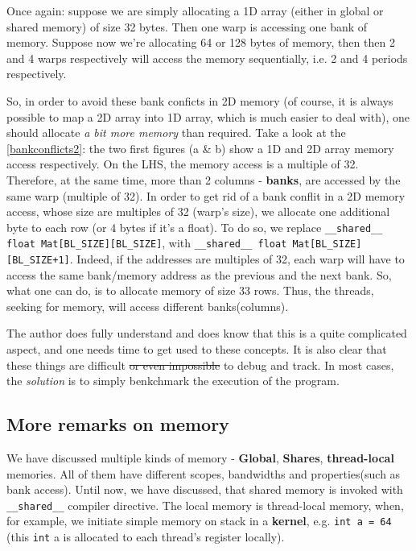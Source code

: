 \documentclass[12pt]{article}
\begin{document}
Once again: suppose we are simply allocating a 1D array (either in global or shared memory) of size 32 bytes. Then one warp is accessing one bank of memory. 
Suppose now we're allocating 64 or 128 bytes of memory, then then 2 and 4 warps  respectively will access the memory sequentially, i.e. 2 and 4 periods respectively.

So, in order to avoid these bank conficts in 2D memory (of course, it is always possible to map a 2D array into 1D array, which is much easier to deal with), one should allocate 
\textit{a bit more memory} than required. Take a look at the \autoref{bankconflicts2}: the two first figures (a \& b) show a 1D and 2D array memory access respectively. 
On the LHS, the memory access is a multiple of 32. Therefore, at the same time, more than 2 columns - \textbf{banks}, are accessed by the same warp (multiple of 32). 
In order to get rid of a bank conflit in a 2D memory access, whose size are multiples of 32 (warp's size), we allocate one additional byte to each row (or 4 bytes if it's a float).
To do so, we replace \verb|__shared__ float Mat[BL_SIZE][BL_SIZE]|, with \verb|__shared__ float Mat[BL_SIZE][BL_SIZE+1]|. Indeed, if the addresses are multiples of 32, each warp will 
have to access the same bank/memory address as the previous and the next bank. So, what one can do, is to allocate memory of size 33 rows. Thus, the threads, seeking for memory, will 
access different banks(columns).

The author does fully understand and does know that this is a quite complicated aspect, and one needs time to get used 
to these concepts. It is also clear that these things are difficult \sout{or even impossible} to debug and track. In most cases, 
the \textit{solution} is to simply benkchmark the execution of the program. 






\subsection{More remarks on memory}
We have discussed multiple kinds of memory - \textbf{Global}, \textbf{Shares}, 
\textbf{thread-local} memories. All of them have different scopes, 
bandwidths and properties(such as bank access).
Until now, we have discussed, that shared memory is invoked with \verb|__shared__| compiler 
directive. The local memory is thread-local memory, when, for example, we initiate simple memory 
on stack in a \textbf{kernel}, e.g. \verb|int a = 64| (this \verb|int| a is allocated to each thread's
register locally). 
\end{document}
